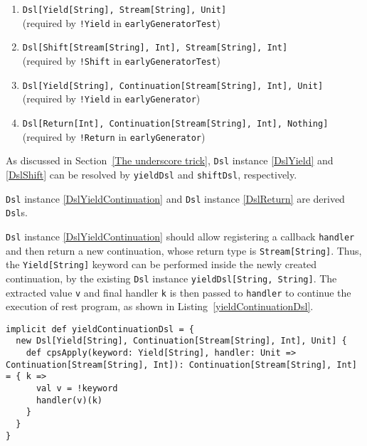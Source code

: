 \begin{enumerate}
  \item \lstinline{Dsl[Yield[String], Stream[String], Unit]} \\ (required by \lstinline{!Yield} in \lstinline{earlyGeneratorTest})
  \label{DslYield}

  \item \lstinline{Dsl[Shift[Stream[String], Int], Stream[String], Int]} \\ (required by \lstinline{!Shift} in \lstinline{earlyGeneratorTest})
  \label{DslShift}
  
  \item \lstinline{Dsl[Yield[String], Continuation[Stream[String], Int], Unit]} \\ (required by \lstinline{!Yield} in \lstinline{earlyGenerator})
  \label{DslYieldContinuation}
  
  \item \lstinline{Dsl[Return[Int], Continuation[Stream[String], Int], Nothing]} \\ (required by \lstinline{!Return} in \lstinline{earlyGenerator})
  \label{DslReturn}
\end{enumerate}

As discussed in Section~\ref{The underscore trick}, \lstinline{Dsl} instance \ref{DslYield} and \ref{DslShift} can be resolved by \lstinline{yieldDsl} and \lstinline{shiftDsl}, respectively.

\lstinline{Dsl} instance \ref{DslYieldContinuation} and \lstinline{Dsl} instance \ref{DslReturn} are derived \lstinline{Dsl}s.

\lstinline{Dsl} instance \ref{DslYieldContinuation} should allow registering a callback \lstinline{handler} and then return a new continuation, whose return type is \lstinline{Stream[String]}. Thus, the \lstinline{Yield[String]} keyword can be performed inside the newly created continuation, by the existing \lstinline{Dsl} instance \lstinline{yieldDsl[String, String]}. The extracted value \lstinline{v} and final handler \lstinline{k} is then passed to \lstinline{handler} to continue the execution of rest program, as shown in Listing~\ref{yieldContinuationDsl}.

\begin{lstlisting}[caption={The derived \lstinline{Dsl} instance for \lstinline{Yield} LDK, which can be used in a \lstinline{Continuation}},label={yieldContinuationDsl}]
implicit def yieldContinuationDsl = {
  new Dsl[Yield[String], Continuation[Stream[String], Int], Unit] {
    def cpsApply(keyword: Yield[String], handler: Unit => Continuation[Stream[String], Int]): Continuation[Stream[String], Int] = { k =>
      val v = !keyword
      handler(v)(k)
    }
  }
}
\end{lstlisting}


